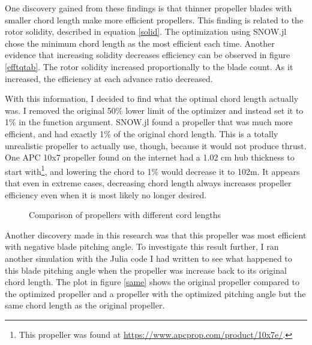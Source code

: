 \documentclass[journal ]{new-aiaa}
\begin{document}
One discovery gained from these findings is that thinner propeller blades with smaller chord length make more efficient propellers. This finding is related to the rotor solidity, described in equation \eqref{solid}. The optimization using SNOW.jl chose the minimum chord length as the most efficient each time. Another evidence that increasing solidity decreases efficiency can be observed in figure \eqref{efftqtab}. The rotor solidity increased proportionally to the blade count. As it increased, the efficiency at each advance ratio decreased.

With this information, I decided to find what the optimal chord length actually was. I removed the original  50\% lower limit of the optimizer and instead set it to 1\% in the function argument. SNOW.jl found a propeller that was much more efficient, and had exactly 1\% of the original chord length. This is a totally unrealistic propeller to actually use, though, because it would not produce thrust. One APC 10x7 propeller found on the internet had a 1.02 cm hub thickness to start with\footnote{This propeller was found at \url{https://www.apcprop.com/product/10x7e/}.}, and lowering the chord to 1\% would decrease it to 102{\textmu}m. It appears that even in extreme cases, decreasing chord length always increases propeller efficiency even when it is most likely no longer desired.

\begin{figure}[H]
\centering
	
	\caption{Comparison of propellers with different cord lengths}
	\captionsetup{aboveskip=0pt,font=it}
	\label{mag}
\end{figure}

Another discovery made in this research was that this propeller was most efficient with negative blade pitching angle. To investigate this result further, I ran another simulation with the Julia code I had written to see what happened to this blade pitching angle when the propeller was increase back to its original chord length. The plot in figure \eqref{same} shows the original propeller compared to the optimized propeller and a propeller with the optimized pitching angle but the same chord length as the original propeller. 
\end{document}
